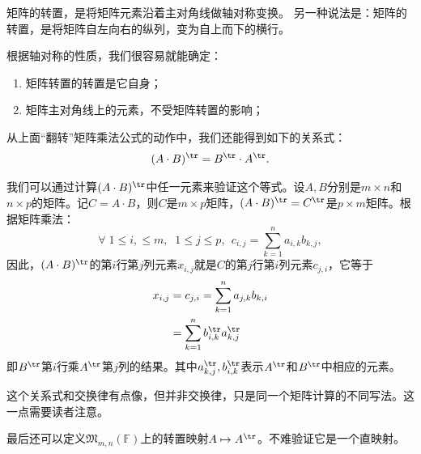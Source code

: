 \documentclass[12pt,UTF8]{ctexbook}
\begin{document}
矩阵的转置，是将矩阵元素沿着主对角线做轴对称变换。
另一种说法是：矩阵的转置，是将矩阵自左向右的纵列，变为自上而下的横行。

根据轴对称的性质，我们很容易就能确定：
\begin{enumerate}
    \item 矩阵转置的转置是它自身；
    \item 矩阵主对角线上的元素，不受矩阵转置的影响；
\end{enumerate}

从上面“翻转”矩阵乘法公式的动作中，我们还能得到如下的关系式：
$$ (A \cdot B)^{\tr} = B^{\tr} \cdot A^{\tr}.$$

我们可以通过计算$(A\cdot B)^{\tr}$中任一元素来验证这个等式。设$A,B$分别是$m\times n$和$n\times p$的矩阵。记$C = A\cdot B$，则$C$是$m \times p$矩阵，$(A\cdot B)^{\tr} = C^{\tr}$是$p\times m$矩阵。根据矩阵乘法：
$$ \forall \; 1\leq i, \leq m,\; \; 1 \leqslant j \leqslant p,\;\, c_{i, j} = \sum_{k=1}^n a_{i,k} b_{k,j},$$
因此，$(A\cdot B)^{\tr}$的第$i$行第$j$列元素$x_{i,j}$就是$C$的第$j$行第$i$列元素$c_{j,i}$，它等于
\begin{align*}
    x_{i,j} &= c_{j,i} = \sum_{k=1}^n a_{j,k} b_{k,i}  \\
    &= \sum_{k=1}^n b^{\tr}_{i, k} a^{\tr}_{k, j}  
\end{align*}
即$B^{\tr}$第$i$行乘$A^{\tr}$第$j$列的结果。其中$a^{\tr}_{k, j} , b^{\tr}_{i, k}$表示$A^{\tr}$和$B^{\tr}$中相应的元素。

这个关系式和交换律有点像，但并非交换律，只是同一个矩阵计算的不同写法。这一点需要读者注意。

最后还可以定义$\mathfrak{M}_{m,n}(\mathbb{F})$上的转置映射$A \mapsto A^{\tr}$。不难验证它是一个直映射。
\end{document}
